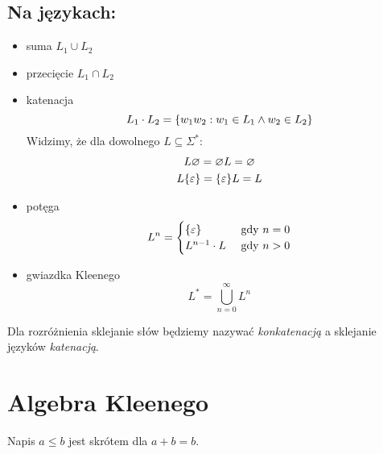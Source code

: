 \subsection{Na językach:}
\begin{itemize}
	\item suma \( L_1 \cup L_2 \)
	\item przecięcie \( L_1 \cap L_2 \)
	\item katenacja
	      \begin{equation*}
		      L_1\cdot L_2 = \set{w_1w_2 : w_1 \in L_1 \land w_2 \in L_2}
	      \end{equation*}
	      Widzimy, że dla dowolnego \(L \subseteq \Sigma^*\):
	      \begin{gather*}
		      L\emptyset = \emptyset L = \emptyset\\
		      L\set{\eps} = \set{\eps}L = L
	      \end{gather*}
	\item potęga
	      \begin{equation*}
		      L^n = \begin{cases}
			      \set{\varepsilon} & \text{ gdy } n = 0 \\
			      L^{n-1} \cdot L   & \text{ gdy } n > 0
		      \end{cases}
	      \end{equation*}
	\item gwiazdka Kleenego
	      \begin{equation*}
		      L^* = \bigcup_{n=0}^\infty L^n
	      \end{equation*}
\end{itemize}

Dla rozróżnienia sklejanie słów będziemy nazywać \textit{konkatenacją} a sklejanie języków \textit{katenacją}.



\section{Algebra Kleenego}
Napis \(a \leq b\) jest skrótem dla \(a + b = b\).

